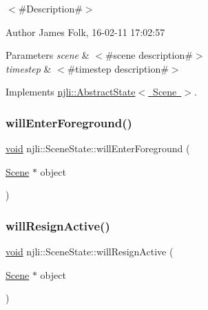 $<$\#\+Description\#$>$ 

\begin{DoxyAuthor}{Author}
James Folk, 16-\/02-\/11 17\+:02\+:57
\end{DoxyAuthor}

\begin{DoxyParams}{Parameters}
{\em scene} & $<$\#scene description\#$>$ \\
\hline
{\em timestep} & $<$\#timestep description\#$>$ \\
\hline
\end{DoxyParams}


Implements \mbox{\hyperlink{classnjli_1_1_abstract_state_aa1d0341a1b1bd83f9b722488680537ad}{njli\+::\+Abstract\+State$<$ Scene $>$}}.

\mbox{\label{classnjli_1_1_scene_state_a2117d146196a7b0d71900218105e2480}} 
\subsubsection{\texorpdfstring{will\+Enter\+Foreground()}{willEnterForeground()}}
{\footnotesize\ttfamily \mbox{\hyperlink{_thread_8h_af1e856da2e658414cb2456cb6f7ebc66}{void}} njli\+::\+Scene\+State\+::will\+Enter\+Foreground (\begin{DoxyParamCaption}\item[{\mbox{\hyperlink{classnjli_1_1_scene}{Scene}} $\ast$}]{object }\end{DoxyParamCaption})}

\mbox{\label{classnjli_1_1_scene_state_affda631631e58dc23fab8a32f77311ca}} 
\subsubsection{\texorpdfstring{will\+Resign\+Active()}{willResignActive()}}
{\footnotesize\ttfamily \mbox{\hyperlink{_thread_8h_af1e856da2e658414cb2456cb6f7ebc66}{void}} njli\+::\+Scene\+State\+::will\+Resign\+Active (\begin{DoxyParamCaption}\item[{\mbox{\hyperlink{classnjli_1_1_scene}{Scene}} $\ast$}]{object }\end{DoxyParamCaption})}

